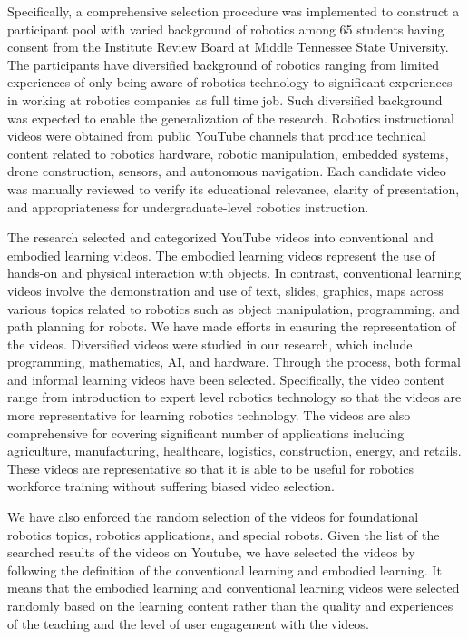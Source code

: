 \documentclass[fleqn,10pt]{JLA_article} %
\begin{document}
Specifically, a comprehensive selection procedure was implemented to construct a participant pool with varied background of robotics among 65 students having consent from the Institute Review Board at Middle Tennessee State University. The participants have diversified background of robotics ranging from limited experiences of only being aware of robotics technology to significant experiences in working at robotics companies as full time job. Such diversified background was expected to enable the generalization of the research. Robotics instructional videos were obtained from public YouTube channels that produce technical content related to robotics hardware, robotic manipulation, embedded systems, drone construction, sensors, and autonomous navigation. Each candidate video was manually reviewed to verify its educational relevance, clarity of presentation, and appropriateness for undergraduate-level robotics instruction.

The research selected and categorized YouTube videos into conventional and embodied learning videos. The embodied learning videos represent the use of hands-on and physical interaction with objects. In contrast, conventional learning videos involve the demonstration and use of text, slides, graphics, maps across various topics related to robotics such as object manipulation, programming, and path planning for robots. We have made efforts in ensuring the representation of the videos. Diversified videos were studied in our research, which include programming, mathematics, AI, and hardware. Through the process, both formal and informal learning videos have been selected. Specifically, the video content range from introduction to expert level robotics technology so that the videos are more representative for learning robotics technology. The videos are also comprehensive for covering significant number of applications including agriculture, manufacturing, healthcare, logistics, construction, energy, and retails. These videos are representative so that it is able to be useful for robotics workforce training without suffering biased video selection.

We have also enforced the random selection of the videos for foundational robotics topics, robotics applications, and special robots. Given the list of the searched results of the videos on Youtube, we have selected the videos by following the definition of the conventional learning and embodied learning. It means that the embodied learning and conventional learning videos were selected randomly based on the learning content rather than the quality and experiences of the teaching and the level of user engagement with the videos.
\end{document}
